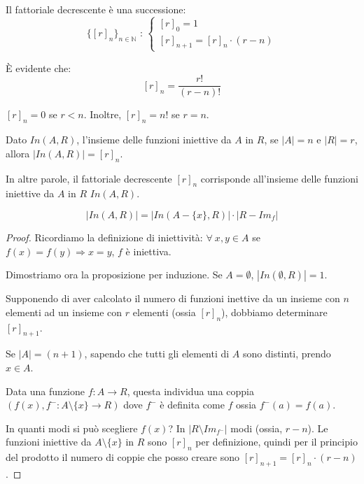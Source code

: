 \begin{defn}
Il fattoriale decrescente \`e una successione:
\[
\{[r]_n\}_{n \in \mathbb{N}} \text{ : }
\begin{cases}
[r]_0 = 1 \\
[r]_{n+1} = [r]_n \cdot (r - n)
\end{cases}
\]
\end{defn}
\`E evidente che:
\[
[r]_n = \frac{r!}{(r-n)!}
\]

\begin{oss}
$[r]_n = 0$ se $r < n$. Inoltre, $[r]_n = n!$ se $r = n$.
\end{oss}

\begin{prop}
Dato $In(A,R)$, l'insieme delle funzioni iniettive da $A$ in $R$, se $|A| = n$ e $|R| = r$, allora $|In (A,R)| = [r]_n$.

In altre parole, il fattoriale decrescente $[r]_n$ corrisponde all'insieme delle funzioni iniettive da $A$ in $R$ $In(A,R)$.

\[
\left| In(A,R) \right| = \left| In (A- \{x\},R) \right| \cdot \left| R - Im_f \right|
\]

\end{prop}
\begin{proof}
Ricordiamo la definizione di iniettivit\`a: $\forall \ x, y \in A$ se $f(x) = f(y) \Rightarrow x = y$, $f$ \`e iniettiva.

Dimostriamo ora la proposizione per induzione. Se $A = \emptyset$, $|In(\emptyset, R)| = 1$.

Supponendo di aver calcolato il numero di funzioni inettive da un insieme con $n$ elementi ad un insieme con $r$ elementi (ossia $[r]_n$), dobbiamo determinare $[r]_{n+1}$.

Se $|A| = (n+1)$, sapendo che tutti gli elementi di $A$ sono distinti, prendo $x \in A$.

Data una funzione $f : A \to R$, questa individua una coppia $(f(x), f^{-} : A \setminus \{ x \} \to R)$ dove $f^{-}$ \`e definita come $f$ ossia $f^{-} (a) = f(a)$.

In quanti modi si pu\`o scegliere $f(x)$? In $|R \setminus Im_{f^-}|$ modi (ossia, $r - n$). Le funzioni iniettive da $A \setminus \{ x \}$ in $R$ sono $[r]_n$ per definizione, quindi per il principio del prodotto il numero di coppie che posso creare sono $[r]_{n+1} = [r]_n \cdot (r - n)$.
\end{proof}

